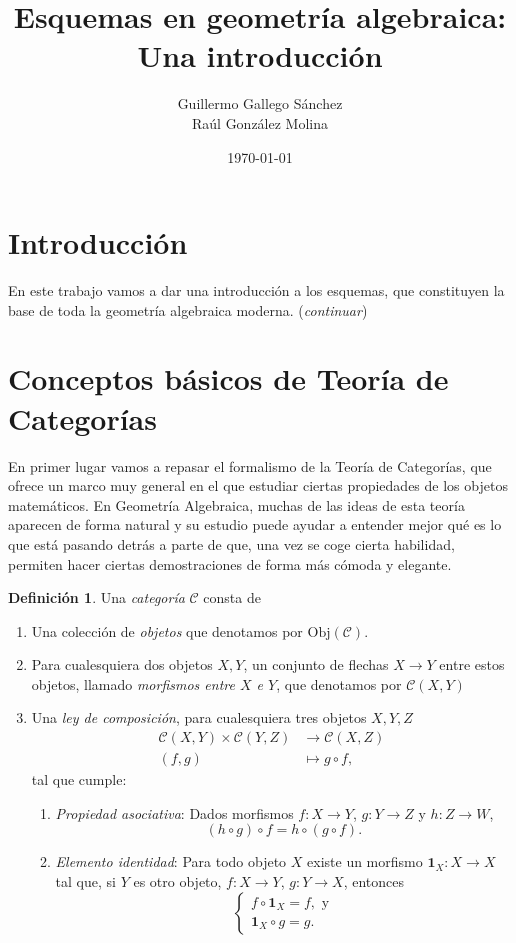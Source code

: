 \documentclass[12pt,a4paper]{article}
\title{ Esquemas en geometría algebraica: Una introducción}
\author{Guillermo Gallego Sánchez \\ Raúl González Molina}
\date{\today}
\theoremstyle{definition} \newtheorem{defn}[thm]{Definición}
\theoremstyle{definition} \newtheorem{ejemplo}[thm]{Ejemplo}
\theoremstyle{definition} \newtheorem{ejercicio}[thm]{Ejercicio}
\theoremstyle{remark} \newtheorem*{obs}{Observación}
\def\cat{\mathscr{C}}
\def\id{\mathbf{1}}
\def\obj{\mathrm{Obj}}
\begin{document}
\maketitle
\section*{Introducción}
En este trabajo vamos a dar una introducción a los esquemas, que constituyen la base de toda la geometría algebraica moderna. (\emph{continuar})
\section{Conceptos básicos de Teoría de Categorías}
En primer lugar vamos a repasar el formalismo de la Teoría de Categorías, que ofrece un marco muy general en el que estudiar ciertas propiedades de los objetos matemáticos. En Geometría Algebraica, muchas de las ideas de esta teoría aparecen de forma natural y su estudio puede ayudar a entender mejor qué es lo que está pasando detrás a parte de que, una vez se coge cierta habilidad, permiten hacer ciertas demostraciones de forma más cómoda y elegante.

\begin{defn}
  Una \emph{categoría} $\cat$ consta de
  \begin{enumerate}
    \item Una colección de \emph{objetos} que denotamos por $\obj(\cat)$.
    \item Para cualesquiera dos objetos $X,Y$, un conjunto de flechas $X\rightarrow Y$ entre estos objetos, llamado \emph{morfismos entre $X$ e $Y$}, que denotamos por $\cat(X,Y)$
    \item Una \emph{ley de composición}, para cualesquiera tres objetos $X,Y,Z$
      \begin{align*}
	\cat(X,Y)\times \cat(Y,Z)&\longrightarrow \cat(X,Z)\\ 
	  (f,g) &\longmapsto g\circ f,
	\end{align*}
 tal que cumple:
 \begin{enumerate}
   \item \textit{Propiedad asociativa}: Dados morfismos $f:X\rightarrow Y$, $g:Y\rightarrow Z$ y $h:Z\rightarrow W$,
     \begin{equation*}
       (h\circ g)\circ f = h\circ(g\circ f).
     \end{equation*}
   \item \textit{Elemento identidad}: Para todo objeto $X$ existe un morfismo $\id_X:X\rightarrow X$ tal que, si $Y$ es otro objeto, $f:X\rightarrow Y$, $g:Y\rightarrow X$, entonces
     \begin{equation*}
       \begin{cases}
	 f\circ \id_X=f, \text{ y} \\
	 \id_X\circ g=g.
       \end{cases}
     \end{equation*}
 \end{enumerate}
  \end{enumerate}
\end{defn}
\end{document}
